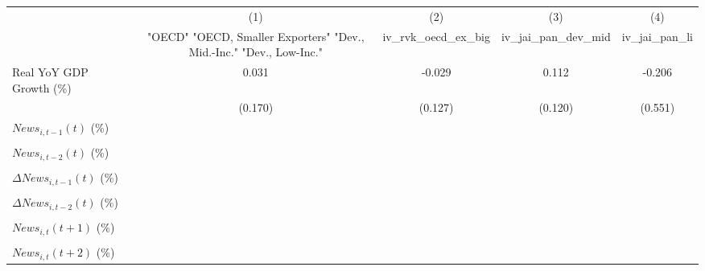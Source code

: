 {
\def\sym#1{\ifmmode^{#1}\else\(^{#1}\)\fi}
\begin{tabular}{l*{4}{c}}
\toprule
                    &\multicolumn{1}{c}{(1)}&\multicolumn{1}{c}{(2)}&\multicolumn{1}{c}{(3)}&\multicolumn{1}{c}{(4)}\\
                    &\multicolumn{1}{c}{ "OECD" "OECD, Smaller Exporters" "Dev., Mid.-Inc." "Dev., Low-Inc."}&\multicolumn{1}{c}{iv_rvk_oecd_ex_big}&\multicolumn{1}{c}{iv_jai_pan_dev_mid}&\multicolumn{1}{c}{iv_jai_pan_li}\\
\midrule
Real YoY GDP Growth (\%)&       0.031         &      -0.029         &       0.112         &      -0.206         \\
                    &     (0.170)         &     (0.127)         &     (0.120)         &     (0.551)         \\
\addlinespace
$ News_{i,t-1}(t)$ (\%)&                     &                     &                     &                     \\
                    &                     &                     &                     &                     \\
\addlinespace
$ News_{i,t-2}(t)$ (\%)&                     &                     &                     &                     \\
                    &                     &                     &                     &                     \\
\addlinespace
$ \Delta News_{i,t-1}(t)$ (\%)&                     &                     &                     &                     \\
                    &                     &                     &                     &                     \\
\addlinespace
$ \Delta News_{i,t-2}(t)$ (\%)&                     &                     &                     &                     \\
                    &                     &                     &                     &                     \\
\addlinespace
$ News_{i,t}(t+1)$ (\%)&                     &                     &                     &                     \\
                    &                     &                     &                     &                     \\
\addlinespace
$ News_{i,t}(t+2)$ (\%)&                     &                     &                     &                     \\

\end{tabular}}
